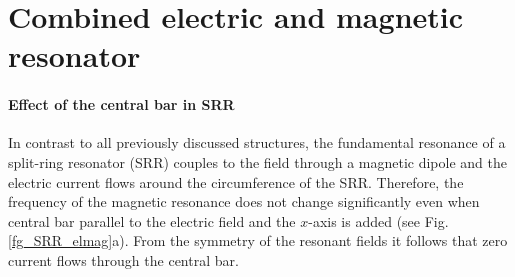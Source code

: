 \section{Combined electric and magnetic resonator} \label{section_emsrr} %
\paragraph{Effect of the central bar in SRR}%
In contrast to all previously discussed structures, the fundamental resonance of a split-ring resonator (SRR) couples to the field through a magnetic dipole and the electric current flows around the circumference of the SRR. Therefore, the frequency of the magnetic resonance does not change significantly even when central bar parallel to the electric field and the $x$-axis is added (see Fig. \ref{fg_SRR_elmag}a). From the symmetry of the resonant fields it follows that zero current flows through the central bar. 

